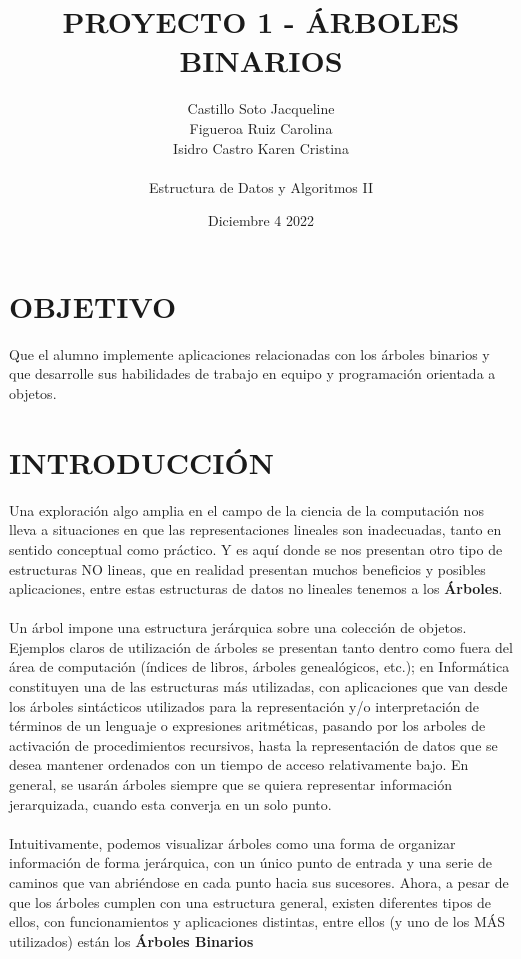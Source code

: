 \documentclass{report}
\title{PROYECTO 1 - ÁRBOLES BINARIOS}
\author{Castillo Soto Jacqueline \\ Figueroa Ruiz Carolina \\ Isidro Castro Karen Cristina \\ \\ Estructura de Datos y Algoritmos II}
\date{Diciembre 4 2022}
\begin{document}
\maketitle

\section{OBJETIVO}
Que el alumno implemente aplicaciones relacionadas con los árboles binarios y que desarrolle sus habilidades de trabajo en equipo y programación orientada a objetos.
\section{INTRODUCCIÓN}
Una exploración algo amplia en el campo de la ciencia de la computación nos lleva a
situaciones en que las representaciones lineales son inadecuadas, tanto en sentido conceptual como práctico. Y es aquí donde se nos presentan otro tipo de estructuras NO lineas, que en realidad presentan muchos beneficios y posibles aplicaciones, entre estas estructuras de datos no lineales tenemos a los \textbf{Árboles}.\\\\
Un árbol impone una estructura jerárquica sobre una colección de objetos. Ejemplos claros
de utilización de árboles se presentan tanto dentro como fuera del área de computación (índices de libros, árboles genealógicos, etc.); en Informática constituyen una de las estructuras más utilizadas, con aplicaciones que van desde los árboles sintácticos utilizados para la representación y/o interpretación de términos de un lenguaje o expresiones aritméticas, pasando por los arboles de activación de procedimientos recursivos, hasta la representación de datos que se desea mantener ordenados con un tiempo de acceso relativamente bajo. En general, se usarán árboles siempre que se quiera representar información jerarquizada, cuando esta converja en un solo punto.\\\\
Intuitivamente, podemos visualizar árboles como una forma de organizar información de
forma jerárquica, con un único punto de entrada y una serie de caminos que van abriéndose en cada punto hacia sus sucesores. Ahora, a pesar de que los árboles cumplen con una estructura general, existen diferentes tipos de ellos, con funcionamientos y aplicaciones distintas, entre ellos (y uno de los MÁS utilizados) están los \textbf{Árboles Binarios}\\\\
\end{document}
